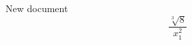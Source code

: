 \documentclass{article}
\begin{document}
New document
\begin{equation}  \frac{\sqrt[3]{8}}{x^{2}_{1}}  \end{equation}
\end{document}
